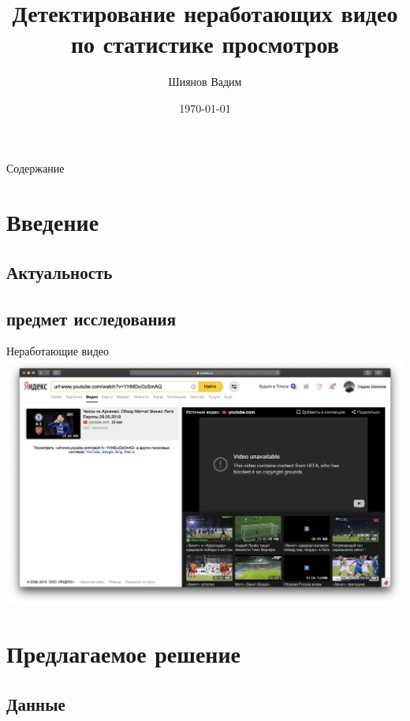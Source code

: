 \documentclass{beamer}
\title{Детектирование неработающих видео \\ по статистике просмотров}
\author{Шиянов Вадим}
\institute{МФТИ (НИУ)}
\date{\today}
\begin{document}
\begin{frame}
    \titlepage
\end{frame}

\begin{frame}{Содержание}
    \tableofcontents
\end{frame}

\section{Введение}

\subsection{Актуальность}
\subsection{предмет исследования}

\begin{frame}{Неработающие видео}
    \includegraphics[width=\textwidth]{../images/yandex_video_bad.png}
\end{frame}

\section{Предлагаемое решение}

\subsection{Данные}
\end{document}
